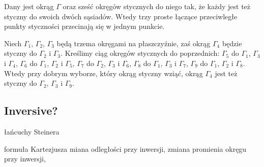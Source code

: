 \begin{proposition}
%
	Dany jest okrąg $\Gamma$ oraz sześć okręgów stycznych do niego tak, że każdy jest też styczny do swoich dwóch sąsiadów.
	Wtedy trzy proste łączące przeciwległe punkty styczności przecinają się w jednym punkcie.
\end{proposition}

\begin{proposition}
%
	Niech $\Gamma_1$, $\Gamma_2$, $\Gamma_3$ będą trzema okręgami na płaszczyźnie, zaś okrąg $\Gamma_4$ będzie styczny do $\Gamma_2$ i $\Gamma_3$.
	Kreślimy ciąg okręgów stycznych do poprzednich:
	$\Gamma_5$ do $\Gamma_1$, $\Gamma_3$ i $\Gamma_4$,
	$\Gamma_6$ do $\Gamma_1$, $\Gamma_2$ i $\Gamma_5$,
	$\Gamma_7$ do $\Gamma_2$, $\Gamma_3$ i $\Gamma_6$,
	$\Gamma_8$ do $\Gamma_1$, $\Gamma_3$ i $\Gamma_7$,
	$\Gamma_9$ do $\Gamma_1$, $\Gamma_2$ i $\Gamma_8$.
	Wtedy przy dobrym wyborze, który okrąg styczny wziąć, okrąg $\Gamma_4$ jest też styczny do $\Gamma_2$, $\Gamma_3$ i $\Gamma_9$.
\end{proposition}

\subsection{Inversive?}
łańcuchy Steinera %

formuła Kartezjusza %
miana odległości przy inwersji, zmiana promienia okręgu przy inwersji, %

